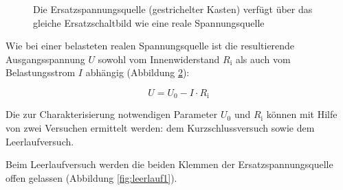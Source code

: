 \begin{frame}
{		
		\begin{figure}[h!]
			
			\begin{center}

				
			\end{center}
			\caption{Die Ersatzspannungsquelle (gestrichelter Kasten) verfügt über das gleiche Ersatzschaltbild wie eine reale Spannungsquelle}
			
			
			\label{fig:testiiiii}
			
			
		\end{figure}
		
		
		
		
		
		Wie bei einer belasteten realen Spannungsquelle ist die resultierende Ausgangsspannung $U$
		sowohl vom Innenwiderstand $R_\mathrm{i}$ als auch vom Belastungsstrom $I$ abhängig (Abbildung \ref{fig:kennliniespannung}):
		
		\begin{equation*}
			U = U_0 - I \cdot R_\mathrm{i}
		\end{equation*}
		
		\begin{figure}[h!]
			\centering
			\s{}
			
			\label{fig:kennliniespannung}
		\end{figure}
		
		
		
		
		Die zur Charakterisierung notwendigen Parameter $U_0$ und $R_\mathrm{i}$ können mit Hilfe von zwei
		Versuchen ermittelt werden: dem Kurzschlussversuch sowie dem Leerlaufversuch.
		
		Beim Leerlaufversuch werden die beiden Klemmen der Ersatzspannungsquelle offen gelassen (Abbildung \ref{fig:leerlauf1}). 
		
}
\end{frame}
